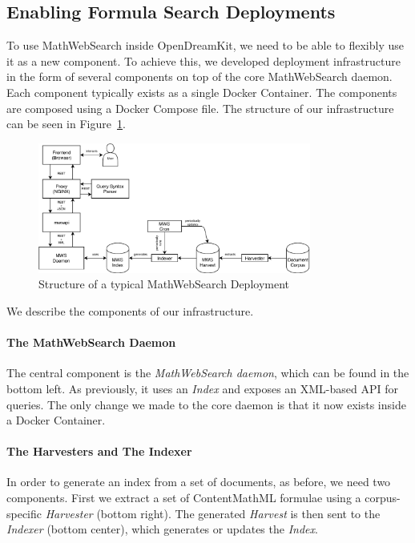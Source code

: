 \subsection{Enabling Formula Search Deployments}

To use MathWebSearch inside OpenDreamKit, we need to be able to flexibly use it as a new component. 
To achieve this, we developed deployment infrastructure in the form of several components on top of the core MathWebSearch daemon. 
Each component typically exists as a single Docker Container. 
The components are composed using a Docker Compose file. The structure of our infrastructure can be seen in Figure~\ref{fig:mwsdeployment}. 

\begin{figure}[ht]
  \includegraphics[width=0.8\textwidth]{mws_layout.pdf}
  \caption{Structure of a typical MathWebSearch Deployment}\label{fig:mwsdeployment}
\end{figure}

We describe the components of our infrastructure. 

\paragraph{The MathWebSearch Daemon}
The central component is the \textit{MathWebSearch daemon}, which can be found in the bottom left. 
As previously, it uses an \textit{Index} and exposes an XML-based API for queries. 
The only change we made to the core daemon is that it now exists inside a Docker Container. 

\paragraph{The Harvesters and The Indexer}
In order to generate an index from a set of documents, as before, we need two components. 
First we extract a set of ContentMathML formulae using a corpus-specific \textit{Harvester} (bottom right). 
The generated \textit{Harvest} is then sent to the \textit{Indexer} (bottom center), which generates or updates the \textit{Index}. 

